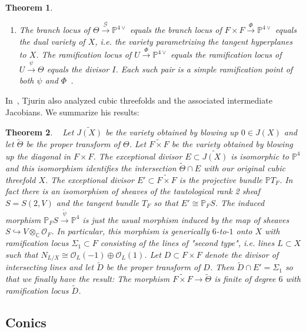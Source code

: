 \documentclass[amssymb,twoside,12 pt,amscd,reqno]{amsart}
\theoremstyle{plain}
\newtheorem{thm}{Theorem}[section]
\theoremstyle{definition}
\newcommand{\CC}{\mathbb{C}}
\newcommand{\PP}{\mathbb{P}}
\def\ps{\vspace{4pt}}
\newcommand{\OO}{\mathcal O}
\begin{document}
\begin{thm}
\begin{enumerate}
\item The branch locus of $\Theta\xrightarrow{\mathcal{G}} \PP^{4\vee}$ equals
the branch locus of $F\times F \xrightarrow{\Phi} \PP^{4\vee}$ equals   
the dual variety of $X$, i.e. the variety 
parametrizing the tangent hyperplanes to $X$.  The 
ramification locus of $U \xrightarrow{\Phi} \PP^{4\vee}$ equals the
ramification 
locus of $U\xrightarrow{\psi} \Theta$ equals
the divisor $I$.  Each
such pair is a simple ramification point of both $\psi$ and
$\Phi$~\cite[lemma 13,8]{CG}.  
\end{enumerate}
\end{thm}

In~\cite{Tj}, Tjurin also analyzed cubic threefolds and the associated 
intermediate Jacobians.  We summarize his results:

\ps

\begin{thm}~\cite{Tj} \label{thm-tj}  
Let $\widetilde{J(X)}$ be the variety obtained by blowing up $0\in J(X)$ and
let $\widetilde{\Theta}$ be the proper transform of $\Theta$.  Let 
$\widetilde{F\times F}$
be the variety obtained by blowing up the diagonal in $F\times F$.  The
exceptional divisor $E\subset\widetilde{J(X)}$ is isomorphic to $\PP^4$ and
this isomorphism identifies the intersection $\widetilde{\Theta}\cap E$ with
our original cubic threefold $X$.  The exceptional divisor $E'\subset
\widetilde{F\times F}$ is the projective bundle $\PP T_F$.  
In fact there is
an isomorphism of sheaves of the tautological rank 2 sheaf $S=S(2,V)$
and the tangent bundle $T_F$ so that $E'\cong \PP_{F}S$.  The induced
morphism $\PP_{F}S\xrightarrow{\tilde{\psi}} \PP^4$ is just the usual
morphism induced by the map of sheaves $S\hookrightarrow V\otimes_\CC \OO_F$.
In particular, this morphism is generically $6$-to-$1$ onto $X$ with 
ramification locus $\Sigma_1\subset F$ consisting of the lines of "second
type", i.e. lines $L\subset X$ such that $N_{L/X}\cong \OO_L(-1)\oplus\OO_L(1)$.
Let $D\subset F\times F$ denote the divisor of intersecting lines and
let $\widetilde{D}$ be the proper transform of $D$.  Then $\widetilde{D}\cap E'
=\Sigma_1$ so that we finally have the result: The morphism
$\widetilde{F\times F}\rightarrow{\widetilde{\Theta}}$ is finite of degree
$6$ with ramification locus $\widetilde{D}$.
\end{thm}

\subsection{Conics}\label{subsec-cons}
\end{document}

